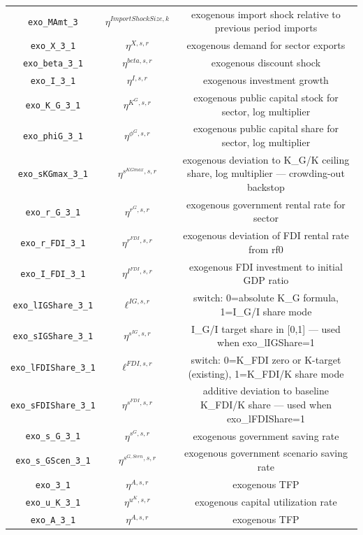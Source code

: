 \begin{center}
\begin{longtable}{ccc}
\texttt{exo\_MAmt\_3} & ${\eta^{Import Shock Size,k}}$ & exogenous import shock relative to previous period imports\\
\texttt{exo\_X\_3\_1} & ${\eta^{X,s,r}}$ & exogenous demand for sector exports\\
\texttt{exo\_beta\_3\_1} & ${\eta^{beta,s,r}}$ & exogenous discount shock\\
\texttt{exo\_I\_3\_1} & ${\eta^{I,s,r}}$ & exogenous investment growth\\
\texttt{exo\_K\_G\_3\_1} & ${\eta^{K^G,s,r}}$ & exogenous public capital stock for sector, log multiplier\\
\texttt{exo\_phiG\_3\_1} & ${\eta^{\phi^{G},s,r}}$ & exogenous public capital share for sector, log multiplier\\
\texttt{exo\_sKGmax\_3\_1} & ${\eta^{s^{KGmax},s,r}}$ & exogenous deviation to K\_G/K ceiling share, log multiplier — crowding-out backstop\\
\texttt{exo\_r\_G\_3\_1} & ${\eta^{r^G,s,r}}$ & exogenous government rental rate for sector\\
\texttt{exo\_r\_FDI\_3\_1} & ${\eta^{r^{FDI},s,r}}$ & exogenous deviation of FDI rental rate from rf0\\
\texttt{exo\_I\_FDI\_3\_1} & ${\eta^{I^{FDI},s,r}}$ & exogenous FDI investment to initial GDP ratio\\
\texttt{exo\_lIGShare\_3\_1} & ${\ell^{IG,s,r}}$ & switch: 0=absolute K\_G formula, 1=I\_G/I share mode\\
\texttt{exo\_sIGShare\_3\_1} & ${\eta^{s^{IG},s,r}}$ & I\_G/I target share in [0,1] — used when exo\_lIGShare=1\\
\texttt{exo\_lFDIShare\_3\_1} & ${\ell^{FDI,s,r}}$ & switch: 0=K\_FDI zero or K-target (existing), 1=K\_FDI/K share mode\\
\texttt{exo\_sFDIShare\_3\_1} & ${\eta^{s^{FDI},s,r}}$ & additive deviation to baseline K\_FDI/K share — used when exo\_lFDIShare=1\\
\texttt{exo\_s\_G\_3\_1} & ${\eta^{s^G,s,r}}$ & exogenous government saving rate\\
\texttt{exo\_s\_GScen\_3\_1} & ${\eta^{s^{G,Scen},s,r}}$ & exogenous government scenario saving rate\\
\texttt{exo\_3\_1} & ${\eta^{A,s,r}}$ & exogenous TFP\\
\texttt{exo\_u\_K\_3\_1} & ${\eta^{u^K,s,r}}$ & exogenous capital utilization rate\\
\texttt{exo\_A\_3\_1} & ${\eta^{A,s,r}}$ & exogenous TFP\\

\end{longtable}
\end{center}
